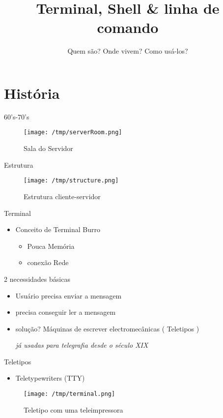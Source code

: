 \documentclass[presentation,aspectratio=169,14pt]{beamer}
\date{}
\title{Terminal, Shell \& linha de comando}
\subtitle{Quem são? Onde vivem? Como usá-los?}
\begin{document}
\maketitle


\section{História}
\label{sec:org331a3e9}
\begin{frame}[label={sec:org50eecbc}]{60's-70's}
\begin{figure}[htbp]
\centering
\texttt{[image: /tmp/serverRoom.png]}
\caption{Sala do Servidor}
\end{figure}
\end{frame}

\begin{frame}[label={sec:org28163f3}]{Estrutura}
\begin{figure}[htbp]
\centering
\texttt{[image: /tmp/structure.png]}
\caption{Estrutura cliente-servidor}
\end{figure}
\end{frame}

\begin{frame}[label={sec:org16a8bf8}]{Terminal}
\begin{itemize}
\item Conceito de Terminal Burro \pause
\begin{itemize}
\item Pouca Memória \pause
\item conexão Rede \pause
\end{itemize}
\end{itemize}
\begin{block}{2 necessidades básicas \pause}
\begin{itemize}
\item Usuário precisa enviar a mensagem \pause
\item precisa conseguir ler a mensagem \pause
\item solução? \pause
Máquinas de escrever electromecânicas ( Teletipos )

\emph{já usadas para telegrafia desde o século XIX}
\end{itemize}
\end{block}
\end{frame}
\begin{frame}[label={sec:org9711761}]{Teletipos}
\begin{itemize}
\item Teletypewriters (TTY)
\end{itemize}
\begin{figure}[htbp]
\centering
\texttt{[image: /tmp/terminal.png]}
\caption{Teletipo com uma teleimpressora}
\end{figure}
\end{frame}
\end{document}

